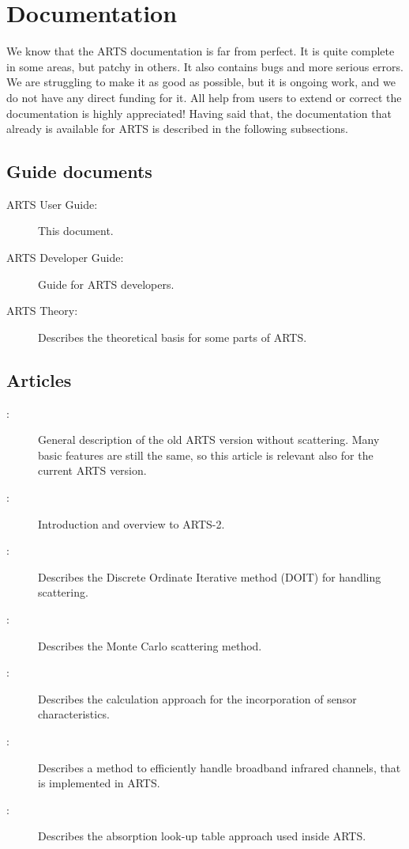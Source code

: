 \section{Documentation}
\label{sec:concept:doc}

We know that the ARTS documentation is far from perfect. It is quite
complete in some areas, but patchy in others. It also contains bugs
and more serious errors. We are struggling to make it as good as
possible, but it is ongoing work, and we do not have any direct
funding for it. All help from users to extend or correct the
documentation is highly appreciated! Having said that, the
documentation that already is available for ARTS is described in the
following subsections.

\subsection{Guide documents}

\begin{description}
\item[ARTS User Guide:] This document.
\item[ARTS Developer Guide:] Guide for ARTS developers.
\item[ARTS Theory:] Describes the theoretical basis for some parts of ARTS.
\end{description}

\subsection{Articles}

\begin{description}
\item[\citet{buehler:artst:05}:] General description of the old ARTS
  version without scattering. Many basic features are still the same,
  so this article is relevant also for the current ARTS version.
\item[\citet{eriksson:arts2:11}:] Introduction and overview to ARTS-2.
\item[\citet{emde04:_doit_jgr}:] Describes the Discrete Ordinate Iterative
  method (DOIT) for handling scattering.
\item[\citet{davisetal:04}:] Describes the Monte Carlo scattering method.
\item[\citet{eriksson:06}:] Describes the calculation approach for the
  incorporation of sensor characteristics.
\item[\citet{buehler:effic:10}:] Describes a method to efficiently handle
  broadband infrared channels, that is implemented in ARTS.
\item[\citet{buehler:absor:11}:] Describes the absorption look-up table
  approach used inside ARTS.
\end{description}

